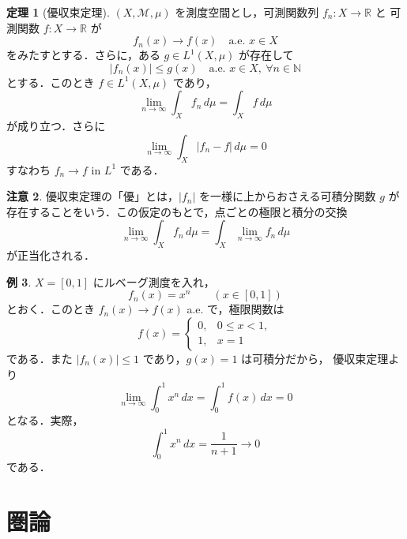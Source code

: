 \documentclass[dvipdfmx,a4paper,12pt]{jsarticle}
\theoremstyle{definition}
\newtheorem{theorem}{定理}[section]
\newtheorem{example}[theorem]{例}
\newtheorem{remark}[theorem]{注意}
\begin{document}
\begin{theorem}[優収束定理]
    $(X,\mathcal{M},\mu)$ を測度空間とし，可測関数列 $f_n\colon X\to\mathbb{R}$ と
    可測関数 $f\colon X\to\mathbb{R}$ が
    $$f_n(x)\to f(x)\quad \text{a.e. }x\in X$$
    をみたすとする．さらに，ある $g\in L^1(X,\mu)$ が存在して
    $$|f_n(x)|\le g(x)\quad \text{a.e. }x\in X,\ \forall n\in\mathbb{N}$$
    とする．このとき $f\in L^1(X,\mu)$ であり，
    $$\lim_{n\to\infty}\int_X f_n\,d\mu=\int_X f\,d\mu$$
    が成り立つ．さらに
    $$\lim_{n\to\infty}\int_X |f_n-f|\,d\mu=0$$
    すなわち $f_n\to f$ in $L^1$ である．
\end{theorem}

\begin{remark}
    優収束定理の「優」とは，$|f_n|$ を一様に上からおさえる可積分関数 $g$ が
    存在することをいう．この仮定のもとで，点ごとの極限と積分の交換
    $$\lim_{n\to\infty}\int_X f_n\,d\mu=\int_X\lim_{n\to\infty}f_n\,d\mu$$
    が正当化される．
\end{remark}

\begin{example}
    $X=[0,1]$ にルベーグ測度を入れ，
    $$f_n(x)=x^n \qquad (x\in[0,1])$$
    とおく．このとき $f_n(x)\to f(x)$ a.e. で，極限関数は
    $$f(x)=
    \begin{cases}
        0,& 0\le x<1,\\
        1,& x=1
    \end{cases}$$
    である．また $|f_n(x)|\le 1$ であり，$g(x)=1$ は可積分だから，
    優収束定理より
    $$\lim_{n\to\infty}\int_0^1 x^n\,dx=\int_0^1 f(x)\,dx=0$$
    となる．実際，
    $$\int_0^1 x^n\,dx=\frac{1}{n+1}\to 0$$
    である．
\end{example}

\section{圏論}
\end{document}
